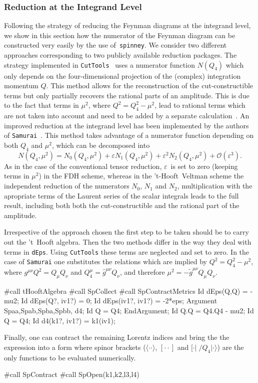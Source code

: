 \documentclass[preprint,number,12pt,sort&compress]{elsarticle}
\newcommand{\spinney}{{\texttt{spinney}}}
\newcommand{\Spaa}[1]{\langle #1 \rangle}
\newcommand{\Spba}[1]{[ #1 \rangle}
\newcommand{\Spbb}[1]{[ #1 ]}
\begin{document}
\subsubsection{Reduction at the Integrand Level}
Following the strategy of reducing the Feynman diagrams
at the integrand level, we show in this section how the numerator
of the Feynman diagram can be constructed very easily by the use of~\spinney{}.
We consider two different approaches corresponding to two publicly
available reduction packages. The strategy implemented in
\texttt{CutTools}~\cite{Ossola:2007ax} uses a numerator function $N(Q_4)$
which only depends on the four-dimensional projection of the (complex)
integration momentum $Q$. This method allows for the reconstruction of
the cut-constructible terms but only partially recovers the rational
parts of an amplitude. This is due to the fact that terms in $\mu^2$,
where $Q^2=Q_4^2-\mu^2$, lead to rational terms which are not taken into
account and need to be added by a separate
calculation~\cite{Draggiotis:2009yb,Garzelli:2009is}.
An improved reduction at the integrand level has been implemented by
the authors of \texttt{Samurai}~\cite{Mastrolia:2010nb}. This method takes advantage of
a numerator function depending on both $Q_4$ and $\mu^2$,
which can be decomposed into
\begin{equation}
N(Q_4,\mu^2)=N_0(Q_4,\mu^2)+\varepsilon N_1(Q_4,\mu^2)
   +\varepsilon^2 N_2(Q_4,\mu^2) + \mathcal O(\varepsilon^3).
\end{equation}
As in the case of the conventional tensor reduction,
$\varepsilon$~is set to zero (keeping terms in $\mu^2$) in the FDH scheme,
whereas in the 't-Hooft~Veltman scheme the independent reduction of the
numerators $N_0$, $N_1$ and $N_2$, multiplication with the
apropriate terms of the Laurent series of the scalar integrals
leads to the full result, including both both the cut-constructible
and the rational part of the amplitude. 

Irrespective of the approach chosen the first step to be taken should be
to carry out the 't~Hooft algebra. Then the two methods differ in the
way they deal with terms in \texttt{dEps}. Using \texttt{CutTools}
these terms are neglected and set to zero. In the case of \texttt{Samurai}
one substitutes the relations which are implied by $Q^2=Q_4^2-\mu^2$,
where $g^{\mu\nu}Q^2=Q_\mu Q_\nu$ and
$Q_4^\mu=\hat{g}^{\mu\nu} Q_\nu$, and therefore
$\mu^2=-\tilde{g}^{\mu\nu} Q_\mu Q_\nu$.
\begin{spform}
#call tHooftAlgebra
#call SpCollect
#call SpContractMetrics
Id dEps(Q,Q) = - mu2;
Id dEps(Q?, iv1?) = 0;
Id dEps(iv1?, iv1?) = -2*eps;
Argument Spaa,Spab,Spba,Spbb, d4;
   Id Q = Q4;
EndArgument;
Id Q.Q = Q4.Q4 - mu2;
Id Q = Q4;
Id d4(k1?, iv1?) = k1(iv1);
\end{spform}
Finally, one can contract the remaining Lorentz indices
and bring the the expression into a form where
spinor brackets ($\Spaa{\cdot\cdot}$, $\Spbb{\cdot\cdot}$ and
$\Spba{\cdot\vert\;/\!\!\!\!Q_4\vert\cdot}$) are the only functions
to be evaluated numerically.
\begin{spform}
#call SpContract
#call SpOpen(k1,k2,l3,l4)
\end{spform}
\end{document}

